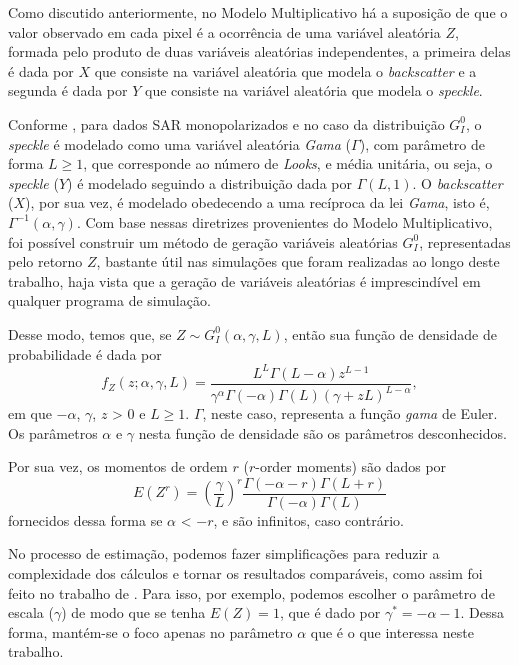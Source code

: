Como discutido anteriormente, no Modelo Multiplicativo há a suposição de que o valor observado em cada pixel é a ocorrência de uma variável aleatória $Z$, formada pelo produto de duas variáveis aleatórias independentes, a primeira delas é dada por $X$ que consiste na variável aleatória que modela o \textit{backscatter} e a segunda é dada por $Y$ que consiste na variável aleatória que modela o \textit{speckle}.

Conforme \citet{FreryStochasticDistances2015}, para dados SAR monopolarizados e no caso da distribuição $G_I^0$, o \textit{speckle} é modelado como uma variável aleatória \textit{Gama} ($\Gamma$), com parâmetro de forma $L \geq 1$, que corresponde ao número de \textit{Looks}, e média unitária, ou seja, o \textit{speckle} ($Y$) é modelado seguindo a distribuição dada por $\Gamma(L,1)$. 
O \textit{backscatter} ($X$), por sua vez, é modelado obedecendo a uma recíproca da lei \textit{Gama}, isto é, $\Gamma^{-1}(\alpha,\gamma)$. 
Com base nessas diretrizes provenientes do Modelo Multiplicativo, foi possível construir um método de geração variáveis aleatórias $G_I^0$, representadas pelo retorno $Z$, bastante útil nas simulações que foram realizadas ao longo deste trabalho, haja vista que a geração de variáveis aleatórias é imprescindível em qualquer programa de simulação.

Desse modo, temos que, se $Z \sim G_I^0(\alpha, \gamma, L)$, então sua função de densidade de probabilidade é dada por
\begin{equation}
    f_Z(z; \alpha, \gamma, \textit{L})= \frac{L^L\Gamma(L-\alpha)z^{L-1}}{\gamma^\alpha\Gamma(-\alpha)\Gamma(L)(\gamma + zL)^{L-\alpha}}, \label{eq:fdpGI0}
\end{equation}
em que $-\alpha$, $\gamma$, $z$ > $0$ e $L \geq 1$. 
$\Gamma$, neste caso, representa a função \textit{gama} de Euler. 
Os parâmetros $\alpha$ e $\gamma$ nesta função de densidade são os parâmetros desconhecidos.

Por sua vez, os momentos de ordem $r$ ($r$-order moments) são dados por
\begin{equation}
    E(Z^r) = \left (\frac{\gamma}{L}\right )^{r}\frac{\Gamma(-\alpha-r)\Gamma(L+r)}{\Gamma(-\alpha)\Gamma(L)} \label{eq:moments}
\end{equation}
fornecidos dessa forma se $\alpha$ < $-r$, e são infinitos, caso contrário.

No processo de estimação, podemos fazer simplificações para reduzir a complexidade dos cálculos e tornar os resultados comparáveis, como assim foi feito no trabalho de \citet{FreryStochasticDistances2015}. Para isso, por exemplo, podemos escolher o parâmetro de escala ($\gamma$) de modo que se tenha $E(Z) = 1$, que é dado por $\gamma^{*} = -\alpha - 1$. Dessa forma, mantém-se o foco apenas no parâmetro $\alpha$ que é o que interessa neste trabalho.

